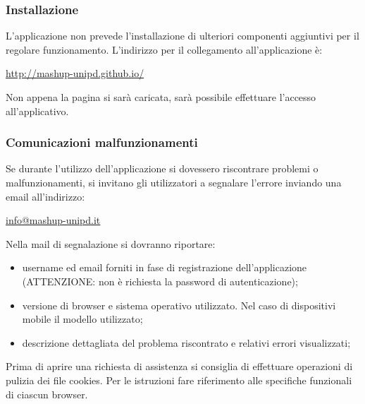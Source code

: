 		\subsubsection{Installazione} %
		\label{sec:installazione}
			L'applicazione non prevede l'installazione di ulteriori componenti aggiuntivi per il regolare funzionamento.
			L'indirizzo per il collegamento all'applicazione è:\newline
			\begin{center}
				\url{http://mashup-unipd.github.io/}
			\end{center}
			Non appena la pagina si sarà caricata, sarà possibile effettuare l'accesso all'applicativo.


		\subsubsection{Comunicazioni malfunzionamenti} %
		\label{sec:installazione}
			Se durante l'utilizzo dell'applicazione \projectName{} si dovessero riscontrare problemi o malfunzionamenti, si invitano gli utilizzatori a segnalare l'errore inviando una email all'indirizzo:
			\begin{center}
				\url{info@mashup-unipd.it}
			\end{center}
			Nella mail di segnalazione si dovranno riportare:
			\begin{itemize}
				\item username ed email forniti in fase di registrazione dell'applicazione (ATTENZIONE: non è richiesta la password di autenticazione\gloss{});
				\item versione di browser\gloss{} e sistema operativo\gloss{} utilizzato. Nel caso di dispositivi mobile il modello utilizzato;
				\item descrizione dettagliata del problema riscontrato e relativi errori visualizzati;
			\end{itemize}
			Prima di aprire una richiesta di assistenza si consiglia di effettuare operazioni di pulizia dei file cookies\gloss{}. Per le istruzioni fare riferimento alle specifiche funzionali di ciascun browser\gloss{}.



